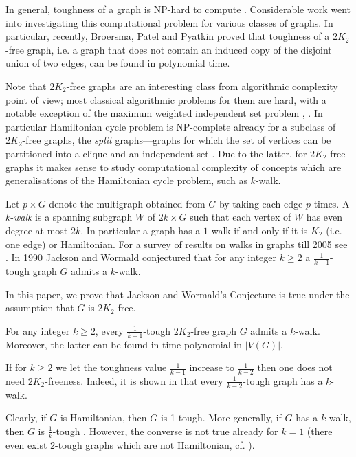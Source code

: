 \documentclass{ws-jktr}
\begin{document}
In general, toughness of a graph is NP-hard to compute
\cite{MR1074858}. Considerable work went into investigating this computational problem for
various classes of graphs. In particular, recently, Broersma, Patel and Pyatkin proved
\cite{broersma2014toughness} that toughness of a $2K_2$-free graph, i.e. a graph that
does not contain an induced copy of the disjoint union of two edges,
can be found in polynomial time.

Note that $2K_2$-free graphs are an interesting
class from algorithmic complexity point of view; most classical algorithmic problems for them are
hard, with a notable exception of the maximum weighted independent set problem
\cite{balasyu1989}, \cite[Graphclass: $2K_2$-free]{isgci}. In particular
Hamiltonian cycle problem is NP-complete already for a subclass of $2K_2$-free graphs,
the {\em split} graphs---graphs for which the set of vertices can be partitioned into
a clique and an independent set \cite[Exercise 6.2]{Golum}.
Due to the latter,  for $2K_2$-free graphs it makes sense to study computational complexity
of concepts which are generalisations of the Hamiltonian cycle
problem, such as $k$-walk.

Let $p\times G$ denote the multigraph obtained from $G$ by taking each edge $p$ times.
A $k$-{\em walk} is a spanning subgraph $W$ of $2k\times G$ such that each vertex of $W$
has even degree at most $2k$. %
In particular a graph has a $1$-walk if and only if it is $K_2$ (i.e. one edge) or Hamiltonian.
{For a survey of results on walks in graphs till 2005 see \cite{kouider2005connected}.}
In 1990 Jackson and Wormald conjectured \cite{jackson1990k} that for any integer $k\ge2$ a
$\frac{1}{k-1}$-tough graph $G$ admits a $k$-walk.

In this paper, we prove that Jackson and Wormald's Conjecture is true under the
assumption that $G$ is  $2K_2$-free.

\begin{theorem}\label{thm2}
For any integer $k\ge2$, every $\frac{1}{k-1}$-tough $2K_2$-free graph $G$
admits a $k$-walk.
Moreover, the latter can be found in time polynomial in $|V(G)|$.
\end{theorem}

If for $k\geq 2$ we let the toughness value $\frac{1}{k-1}$ increase to
$\frac{1}{k-2}$ then
one does not need $2K_2$-freeness. Indeed, it is shown in
\cite{jackson1990k} that
every $\frac{1}{k-2}$-tough graph has a $k$-walk.

Clearly, if $G$ is
Hamiltonian, then $G$ is 1-tough.  More generally,
if $G$ has a $k$-walk, then $G$ is $\frac{1}{k}$-tough \cite{jackson1990k}.
However, the converse is not true already for $k=1$ (there even exist $2$-tough graphs which are
not Hamiltonian, cf. \cite{bauer2000not}).
\end{document}
